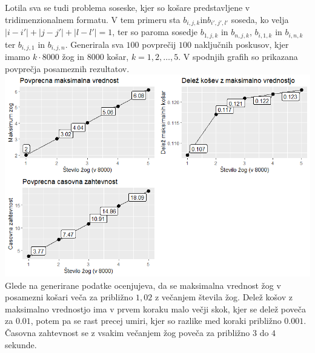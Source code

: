 \documentclass[a4paper, 11pt]{article}
\begin{document}
Lotila sva se tudi problema soseske, kjer so košare predstavljene v tridimenzionalnem formatu.
V tem primeru sta $b_{i,j,k} $in$ b_{i',j',l'}$ soseda, ko velja $|i-i'|+|j-j'|+|l-l'| = 1$, ter so paroma sosedje 
$b_{1,j,k} $ in $b_{n,j,k}$, $b_{i,1,k} $ in $b_{i,n,k}$ ter $b_{i,j,1} $ in $b_{i,j,n}$.
\linebreak
Generirala sva $100$ povprečij $100$ naključnih poskusov, kjer imamo $k \cdot 8000$ žog in $8000$ košar, $k=1,2, \dots, 5$. 
V spodnjih grafih so prikazana povprečja posameznih rezultatov. 
\bigbreak
\includegraphics[scale=0.65]{graf_3d1.png}
\\
Glede na generirane podatke ocenjujeva, da se maksimalna vrednost žog v posamezni košari veča za približno $1,02$ z večanjem
števila žog. Delež košov z maksimalno vrednostjo ima v prvem koraku malo večji skok, kjer se delež poveča za 
$0.01$, potem pa se rast precej umiri, kjer so razlike med koraki približno $0.001$. Časovna zahtevnost se z vsakim večanjem žog poveča za približno $3$ do $4$ sekunde.
\end{document}
